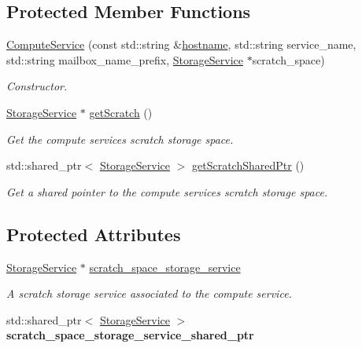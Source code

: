 \subsection*{Protected Member Functions}
\begin{DoxyCompactItemize}
\item 
\hyperlink{classwrench_1_1_compute_service_afa84f3dd13d7fac9632ded22db2d8c4f}{Compute\+Service} (const std\+::string \&\hyperlink{classwrench_1_1_s4_u___daemon_a52bc0b9a6cd248310749dac086819f00}{hostname}, std\+::string service\+\_\+name, std\+::string mailbox\+\_\+name\+\_\+prefix, \hyperlink{classwrench_1_1_storage_service}{Storage\+Service} $\ast$scratch\+\_\+space)
\begin{DoxyCompactList}\small\item\em Constructor. \end{DoxyCompactList}\item 
\hyperlink{classwrench_1_1_storage_service}{Storage\+Service} $\ast$ \hyperlink{classwrench_1_1_compute_service_a751da474fe424957a614116cef6a5e13}{get\+Scratch} ()
\begin{DoxyCompactList}\small\item\em Get the compute service\textquotesingle{}s scratch storage space. \end{DoxyCompactList}\item 
std\+::shared\+\_\+ptr$<$ \hyperlink{classwrench_1_1_storage_service}{Storage\+Service} $>$ \hyperlink{classwrench_1_1_compute_service_a6532846cd02094b6095341d37d5b2bf7}{get\+Scratch\+Shared\+Ptr} ()
\begin{DoxyCompactList}\small\item\em Get a shared pointer to the compute service\textquotesingle{}s scratch storage space. \end{DoxyCompactList}\end{DoxyCompactItemize}
\subsection*{Protected Attributes}
\begin{DoxyCompactItemize}
\item 
\mbox{\label{classwrench_1_1_compute_service_a41fa63f7200275c18f3bcb0dda9099a5}} 
\hyperlink{classwrench_1_1_storage_service}{Storage\+Service} $\ast$ \hyperlink{classwrench_1_1_compute_service_a41fa63f7200275c18f3bcb0dda9099a5}{scratch\+\_\+space\+\_\+storage\+\_\+service}
\begin{DoxyCompactList}\small\item\em A scratch storage service associated to the compute service. \end{DoxyCompactList}\item 
\mbox{\label{classwrench_1_1_compute_service_a851cc870ccd1b6c9243fb83cbb34be71}} 
std\+::shared\+\_\+ptr$<$ \hyperlink{classwrench_1_1_storage_service}{Storage\+Service} $>$ {\bfseries scratch\+\_\+space\+\_\+storage\+\_\+service\+\_\+shared\+\_\+ptr}
\end{DoxyCompactItemize}
